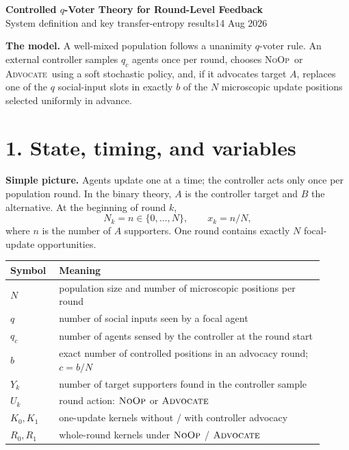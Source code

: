\documentclass[9pt]{extarticle}
\newcommand{\Adv}{\textsc{Advocate}}
\newcommand{\Noop}{\textsc{NoOp}}
\begin{document}
\begin{center}
{\Large\bfseries Controlled $q$-Voter Theory for Round-Level Feedback}\\[-1mm]
{\normalsize System definition and key transfer-entropy results}\hfill {\small 14 Aug 2026}
\end{center}
\vspace{-1mm}
\begin{boxx}
\textbf{The model.} A well-mixed population follows a unanimity $q$-voter rule. An external controller samples $q_c$ agents once per round, chooses \Noop\ or \Adv\ using a soft stochastic policy, and, if it advocates target $A$, replaces one of the $q$ social-input slots in exactly $b$ of the $N$ microscopic update positions selected uniformly in advance.
\end{boxx}

\section*{1. State, timing, and variables}
\textbf{Simple picture.} Agents update one at a time; the controller acts only once per population round. In the binary theory, $A$ is the controller target and $B$ the alternative. At the beginning of round $k$,
\[
N_k=n\in\{0,\ldots,N\},\qquad x_k=n/N,
\]
where $n$ is the number of $A$ supporters. One round contains exactly $N$ focal-update opportunities.

\begin{center}\small
\begin{tabular}{>{\raggedright\arraybackslash}p{0.13\linewidth}p{0.78\linewidth}}
\toprule
Symbol & Meaning \\
\midrule
$N$ & population size and number of microscopic positions per round \\
$q$ & number of social inputs seen by a focal agent \\
$q_c$ & number of agents sensed by the controller at the round start \\
$b$ & exact number of controlled positions in an advocacy round; $c=b/N$ \\
$Y_k$ & number of target supporters found in the controller sample \\
$U_k$ & round action: $\Noop$ or $\Adv$ \\
$K_0,K_1$ & one-update kernels without / with controller advocacy \\
$R_0,R_1$ & whole-round kernels under $\Noop$ / $\Adv$ \\
\bottomrule
\end{tabular}
\end{center}
\end{document}
